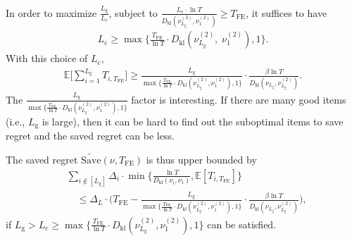 \documentclass[twoside,11pt]{article}
\newcommand{\kl}{D_{\mathrm{kl}}}
\newcommand{\rmc}{\mathrm{c}}
\newcommand{\rmg}{\mathrm{g}}
\newcommand{\bbE}{\mathbb{E}}
\newcommand{\Tfe}{T_{\mathrm{FE}}}
\newcommand{\Saved}{\mathrm{Save}}
\begin{document}
In order to maximize $\frac{L_{\rmg}}{L_{\rmc}} $, subject to $\frac{L_{\rmc}\cdot\ln T}{\kl(\nu_{L_{\rmg}}^{(2)},\nu_{1}^{(2)})} \geq \Tfe$, it suffices to have 
\begin{align}\label{equ:lowbdreq}
    L_{\rmc}\geq \max\bigg\{\frac{\Tfe}{\ln T}\cdot \kl(\nu_{L_{\rmg}}^{(2)},\;\nu_{1}^{(2)}),1\bigg\}.
\end{align}
With this choice of $L_{\rmc}$,
\begin{align}\label{equ:lowbd3}
    \bbE\bigg[\sum_{i=1}^{L_{\rmg}} T_{i,\Tfe}\bigg ]
    \geq 
    \frac{L_{\rmg}}{\max\big\{\frac{\Tfe}{\ln T}\cdot \kl(\nu_{L_{\rmg}}^{(2)},\nu_{1}^{(2)}),1\big\}}
    \cdot
    \frac{\beta\ln T}{\kl(\nu_{L_{\rmg}},\nu_{L_{\rmg}}^{(2)})}.
\end{align}
The $ \frac{L_{\rmg}}{\max\big\{\frac{\Tfe}{\ln T}\cdot \kl(\nu_{L_{\rmg}}^{(2)},\nu_{1}^{(2)}),1\big\}}$ factor is interesting. If there are many good items (i.e., $L_{\rmg}$ is large), then it can be hard to find out the suboptimal items to save regret and the saved regret can be less.

The saved regret $\widetilde{\Saved}(\nu,\Tfe)$ is thus upper bounded by 
\begin{align}
    &\sum_{i\notin [L_{\rmg}]}
    \Delta_i\cdot \min\bigg\{\frac{\ln T}{\kl(\nu_i,\nu_1)},\bbE[T_{i,\Tfe}]\bigg\}
    \\
    &\quad\leq
    \Delta_L \cdot \bigg(
        \Tfe - 
        \frac{L_{\rmg}}{\max\big\{\frac{\Tfe}{\ln T}\cdot \kl(\nu_{L_{\rmg}}^{(2)},\nu_{1}^{(2)}),1\big\}}\cdot\frac{\beta\ln T}{\kl(\nu_{L_{\rmg}},\nu_{L_{\rmg}}^{(2)})}
    \bigg),
\end{align}
if $L_{\rmg}>L_{\rmc}\geq \max\big\{\frac{\Tfe}{\ln T}\cdot \kl(\nu_{L_{\rmg}}^{(2)},\nu_{1}^{(2)}),1\big\}$ can be satisfied.
\end{document}
